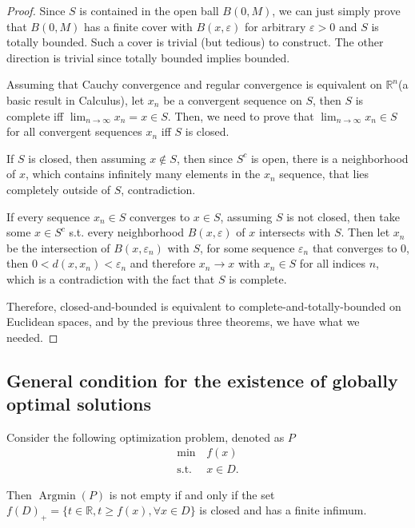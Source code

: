 \begin{proof}
  Since \( S \) is contained in the open ball \( B(0, M) \), we can just simply
  prove that \( B(0, M) \) has a finite cover with \( B(x, \varepsilon) \) for
  arbitrary \( \varepsilon > 0 \) and \( S \) is totally bounded. Such a cover
  is trivial (but tedious) to construct. The other direction is trivial since
  totally bounded implies bounded.

  Assuming that Cauchy convergence and regular convergence is equivalent on \(
  \mathbb{R}^{n} \)(a basic result in Calculus), let \( x_{n} \) be a
  convergent sequence on \( S \), then \( S \) is complete iff \(  \lim_{n \to
  \infty} x_{n} =x \in S \). Then, we need to prove that \( \lim_{n \to \infty}
  x_{n} \in S\) for all convergent sequences \( x_{n} \) iff \( S \) is closed.

  If \( S \) is closed, then assuming \( x \notin S \), then since \( S^{c} \)
  is open, there is a neighborhood of \( x \), which contains infinitely many
  elements in the \( x_{n} \) sequence, that lies completely outside of \( S \),
  contradiction.

  If every sequence \( x_{n} \in S \) converges to \( x \in S \), assuming \( S
  \) is not closed, then take some \( x \in S^{c} \) s.t. every neighborhood \(
  B(x, \varepsilon)\) of \( x \)  intersects with \( S \). Then let \( x_{n} \)
  be the intersection of \( B(x, \varepsilon_{n}) \) with \( S \), for some
  sequence \( \varepsilon_{n} \) that converges to \( 0 \), then \( 0 < d(x,
  x_{n}) < \varepsilon_{n} \) and therefore \( x_{n} \to  x \) with \( x_{n} \in
  S\) for all indices \( n \), which is a contradiction with the fact that \( S
  \) is complete.

  Therefore, closed-and-bounded is equivalent to complete-and-totally-bounded on
  Euclidean spaces, and by the previous three theorems, we have what we needed.
\end{proof}


\subsection{General condition for the existence of globally optimal solutions} %
\label{sub:General condition for the existence of globally optimal solutions}

\begin{theorem}
  Consider the following optimization problem, denoted as \( P \)
  \begin{align*}
    \min\, &f(x)\\
    \text{s.t.}\, &x \in D
  .\end{align*}

  Then \( \operatorname{Argmin}(P) \) is not empty if and only if the set \(
  f(D)_{+} = \{t \in \mathbb{R}, t \ge f(x), \forall x \in D\}   \) is closed and
  has a finite infimum.
\end{theorem}

